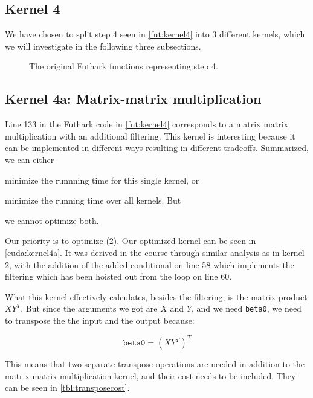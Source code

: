 \subsection*{Kernel 4}

We have chosen to split step 4 seen in \autoref{fut:kernel4} into 3 different
kernels, which we will investigate in the following three subsections.

\begin{figure}[H]
    \centering
    \caption{The original Futhark functions representing step 4.}
    \label{fut:kernel4}
\end{figure}

\subsection{Kernel 4a: Matrix-matrix multiplication}

Line 133 in the Futhark code in \autoref{fut:kernel4} corresponds to a matrix
matrix multiplication with an additional filtering. 
%
This kernel is interesting because it can be implemented in different ways
resulting in different tradeoffs. Summarized, we can either 
%
\begin{enumerate*}[label=(\arabic*)]
    \item minimize the runnning time for this single kernel, or
    \item minimize the running time over all kernels. But
    \item we cannot optimize both.
\end{enumerate*}
%
Our priority is to optimize (2).
%
Our optimized kernel  can be seen in \autoref{cuda:kernel4a}. It was derived in
the course through similar analysis as in kernel 2, with the addition of the
added conditional on line 58 which implements the filtering which has been
hoisted out from the loop on line 60.  %

What this kernel effectively calculates, besides the filtering, is 
the matrix product \(XY^T\). But since the arguments we got are \(X\) and \(Y\),
and we need \texttt{beta0}, we need to transpose the the input and the output
because:

\[ \texttt{beta0} = (XY^T)^T  \]

This means that two separate transpose operations are needed in addition to the
matrix matrix multiplication kernel, and their cost needs to be included. They
can be seen in \autoref{tbl:transposecost}.



